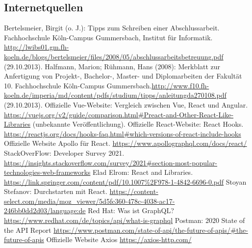 \documentclass[a4paper,12pt,oneside]{article}
\begin{document}
     \subsection{Internetquellen}
     \begin{thebibliography}{HR08} %
       Bertelsmeier, Birgit (o. J.): Tipps zum Schrei\-b\-en ei\-n\-er Ab\-sch\-luss\-ar\-beit. Fach\-hoch\-schu\-le Köln-Campus Gummersbach, Institut für Informatik. \url{http://lwibs01.gm.fh-koeln.de/blogs/bertelsmeier/files/2008/05/abschlussarbeitsbetreuung.pdf} (29.10.2013).
         Halfmann, Marion; Rühmann, Hans (2008): Merkblatt zur Anfertigung von Projekt-, Bachelor-, Master- und Diplomarbeiten der Fakultät 10. Fachhochschule Köln-Campus Gummersbach.\url{http://www.f10.fh-koeln.de/imperia/md/content/pdfs/studium/tipps/anleitungda270108.pdf} (29.10.2013).
         Offizielle Vue-Website: Vergleich zwischen Vue, React und Angular. \url{https://vuejs.org/v2/guide/comparison.html#Preact-and-Other-React-Like-Libraries} (unbekannte Veröffentlichung).
        Offizielle React-Website: React Hooks. \url{https://reactjs.org/docs/hooks-faq.html#which-versions-of-react-include-hooks}
        Offizielle Website Apollo für React. \url{https://www.apollographql.com/docs/react/}
        StackOverFlow: Developer Survey 2021. \url{https://insights.stackoverflow.com/survey/2021#section-most-popular-technologies-web-frameworks}
        Elad Elrom: React and Libraries. \url{https://link.springer.com/content/pdf/10.1007%2F978-1-4842-6696-0.pdf}
        Stoyan Stefanov: Durchstarten mit React. \url{https://content-select.com/media/moz_viewer/5d5fc360-478c-4038-ac17-246bb0dd2d03/language:de}
        Red Hat: Was ist GraphQL? \url{https://www.redhat.com/de/topics/api/what-is-graphql}
        Postman: 2020 State of the API Report \url{https://www.postman.com/state-of-api/the-future-of-apis/#the-future-of-apis}
        Offizielle Website Axios \url{https://axios-http.com/}

        
        
     \end{thebibliography} 
  
\end{document}
